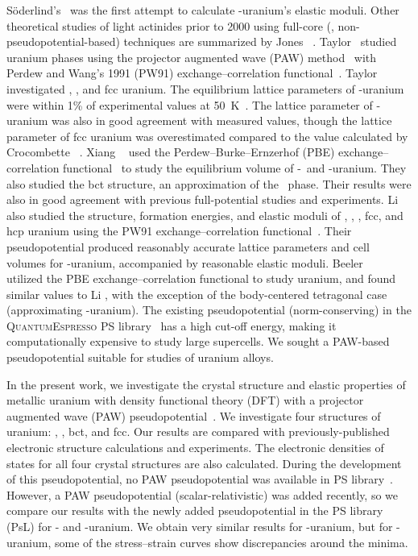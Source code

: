 S\"oderlind's~\cite{soderlind2002first} was the first attempt to calculate
\textalpha-uranium's elastic moduli. Other theoretical studies of light
actinides prior to 2000 using full-core (\ie, non-pseudopotential-based)
techniques are summarized by Jones \etal~\cite{jones2000theoretical}.
Taylor~\cite{taylor2008evaluation} studied uranium phases using the projector
augmented wave (PAW) method~\cite{Bloechl1994} with Perdew and Wang's 1991
(PW91) exchange--correlation functional~\cite{Perdew1992a,Perdew1993}. Taylor
investigated \textalpha, \textgamma, and fcc uranium. The equilibrium lattice
parameters of \mbox{\textalpha-uranium} were within 1\% of experimental
values at 50~K~\cite{barrett1963crystal}. The lattice parameter of
\textgamma-uranium was also in good agreement with measured values, though
the lattice parameter of fcc uranium was overestimated compared to the value
calculated by Crocombette \etal~\cite{crocombette2001plane}. Xiang
\etal~\cite{xiang2008quantum} used the Perdew--Burke--Ernzerhof (PBE) 
exchange--correlation functional~\cite{Perdew1996b,Perdew1997}
to study the equilibrium volume of \textalpha-~and \textgamma-uranium. They
also studied the bct structure, an approximation of the \textbeta~phase.
Their results were also in good agreement with previous full-potential studies
and experiments.
Li \etal~\cite{li2012structure} also studied the
structure, formation energies, and elastic moduli of \textalpha, \textbeta,
\textgamma, fcc, and hcp uranium using the PW91 exchange--correlation
functional~\cite{Perdew1992b}. Their pseudopotential produced reasonably
accurate lattice parameters and cell volumes for
\textalpha-uranium, accompanied by reasonable elastic moduli.
Beeler \etal~\cite{beeler2013first} utilized the PBE
exchange--correlation functional to study uranium, and found similar values
to Li \etal, with the exception of the body-centered tetragonal case
(approximating \textbeta-uranium). The existing pseudopotential
(norm-conserving) in the \textsc{QuantumEspresso} PS library~\cite{pp1,
dal2014pseudopotentials} has a high cut-off energy, making it computationally
expensive to study large supercells. We sought a PAW-based pseudopotential
suitable for studies of uranium alloys.


In the present work, we investigate the crystal structure and elastic
properties of metallic uranium with density functional theory (DFT) with a
projector augmented wave (PAW) pseudopotential~\cite{Bloechl1994}. We
investigate four structures of uranium: \textalpha, \textgamma, bct, and fcc.
Our results are compared with previously-published electronic structure
calculations and experiments. The electronic densities of
states for all four crystal structures are also calculated.
During the development of this pseudopotential, no PAW pseudopotential was available in PS library~\cite{pp1, dal2014pseudopotentials}. However, a PAW pseudopotential (scalar-relativistic) was added recently, so we compare our results with the newly added pseudopotential in the PS library (PsL) for \textalpha- and \textgamma-uranium. We obtain very similar results for \textalpha-uranium, but for \textgamma-uranium, some of the stress--strain curves show discrepancies around the minima. 



